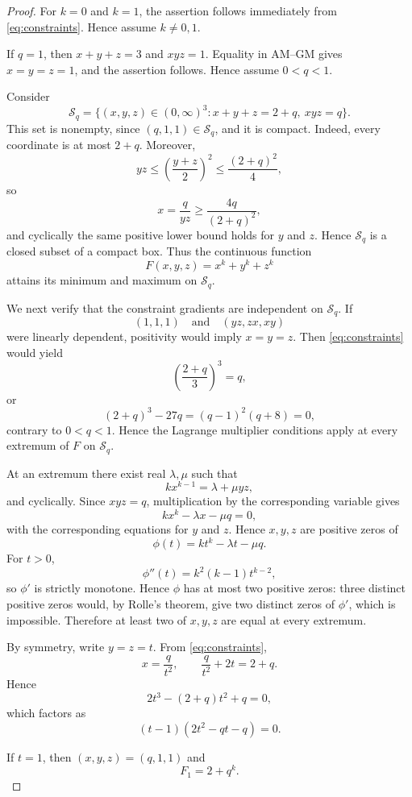 \documentclass[11pt]{amsart}
\theoremstyle{remark}
\begin{document}
\begin{proof}
For $k=0$ and $k=1$, the assertion follows immediately from
\eqref{eq:constraints}. Hence assume $k\ne0,1$.

If $q=1$, then $x+y+z=3$ and $xyz=1$. Equality in AM--GM gives
$x=y=z=1$, and the assertion follows. Hence assume $0<q<1$.

Consider
\[
 \mathcal S_q=\{(x,y,z)\in(0,\infty)^3:x+y+z=2+q,\ xyz=q\}.
\]
This set is nonempty, since $(q,1,1)\in\mathcal S_q$, and it is compact. Indeed, every coordinate is at most $2+q$. Moreover,
\[
 yz\le \left(\frac{y+z}{2}\right)^2\le\frac{(2+q)^2}{4},
\]
so
\[
 x=\frac{q}{yz}\ge\frac{4q}{(2+q)^2},
\]
and cyclically the same positive lower bound holds for $y$ and $z$. Hence $\mathcal S_q$ is a closed subset of a compact box. Thus the continuous function
\[
 F(x,y,z)=x^k+y^k+z^k
\]
attains its minimum and maximum on $\mathcal S_q$.

We next verify that the constraint gradients are independent on $\mathcal S_q$. If
\[
 (1,1,1)\quad\text{and}\quad(yz,zx,xy)
\]
were linearly dependent, positivity would imply $x=y=z$. Then \eqref{eq:constraints} would yield
\[
 \left(\frac{2+q}{3}\right)^3=q,
\]
or
\[
 (2+q)^3-27q=(q-1)^2(q+8)=0,
\]
contrary to $0<q<1$. Hence the Lagrange multiplier conditions apply at every extremum of $F$ on $\mathcal S_q$.

At an extremum there exist real $\lambda,\mu$ such that
\[
 kx^{k-1}=\lambda+\mu yz,
\]
and cyclically. Since $xyz=q$, multiplication by the corresponding variable gives
\[
 kx^k-\lambda x-\mu q=0,
\]
with the corresponding equations for $y$ and $z$. Hence $x,y,z$ are positive zeros of
\[
 \phi(t)=kt^k-\lambda t-\mu q.
\]
For $t>0$,
\[
 \phi''(t)=k^2(k-1)t^{k-2},
\]
so $\phi'$ is strictly monotone. Hence $\phi$ has at most two positive
zeros: three distinct positive zeros would, by Rolle's theorem, give two
distinct zeros of $\phi'$, which is impossible. Therefore at least two
of $x,y,z$ are equal at every extremum.

By symmetry, write $y=z=t$. From \eqref{eq:constraints},
\[
 x=\frac{q}{t^2},\qquad \frac{q}{t^2}+2t=2+q.
\]
Hence
\[
 2t^3-(2+q)t^2+q=0,
\]
which factors as
\begin{equation}\label{eq:factor}
 (t-1)(2t^2-qt-q)=0.
\end{equation}

If $t=1$, then $(x,y,z)=(q,1,1)$ and
\begin{equation}\label{eq:F1}
 F_1=2+q^k.
\end{equation}


\end{proof}
\end{document}
